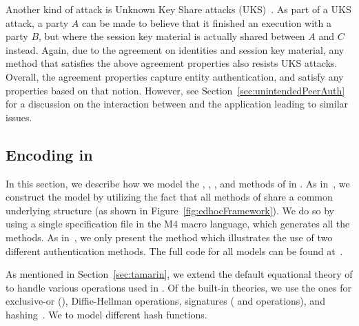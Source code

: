 Another kind of attack is Unknown Key Share attacks
(UKS)~\cite{DBLP:conf/ima/Blake-WilsonJM97}.
%
As part of a UKS attack, a party $A$ can be made to believe that it finished
an execution with a party $B$, but where the session key material is actually
shared between $A$ and $C$ instead.
%
Again, due to the agreement on identities and session key material, any 
method
that satisfies the above agreement properties also resists UKS attacks.
%
Overall, the agreement properties capture entity authentication,
and satisfy any properties based on that notion.
%
However, see Section~\ref{sec:unintendedPeerAuth} for a discussion on the
interaction between \mEdhoc{} and the application leading to similar issues.
%

\subsection{Encoding \mEdhoc{} in \mTamarin}
\label{sec:modeling}
%
In this section, we describe how we model the \mSigSig, \mSigStat, \mStatSig,
and \mStatStat{} methods of \mEdhoc{} in \mTamarin.
%
As in~\cite{Norr21}, we construct the \mTamarin{} model by utilizing the fact
that all methods of \mEdhoc{} share a common underlying structure
(as shown in Figure~\ref{fig:edhocFramework}).
%
We do so by using a single specification file in the M4 macro language,
which generates all the methods.
%
As in~\cite{Norr21}, we only present the \mStatSig{} method which illustrates
the use of two different authentication methods.
%
The full \mTamarin{} code for all models can be found 
at~\cite{edhocTamarinRepo}.
%

As mentioned in Section~\ref{sec:tamarin}, we extend the default
equational theory of \mTamarin{} to handle various operations used in 
\mEdhoc.
%
Of the built-in theories, we use the ones for exclusive-or (\mXor),
Diffie-Hellman operations, signatures ( and  operations),
and 
hashing~\cite{DBLP:conf/csfw/DreierHRS18,DBLP:conf/csfw/SchmidtMCB12}.
%
We 
to
model different hash functions.
%

